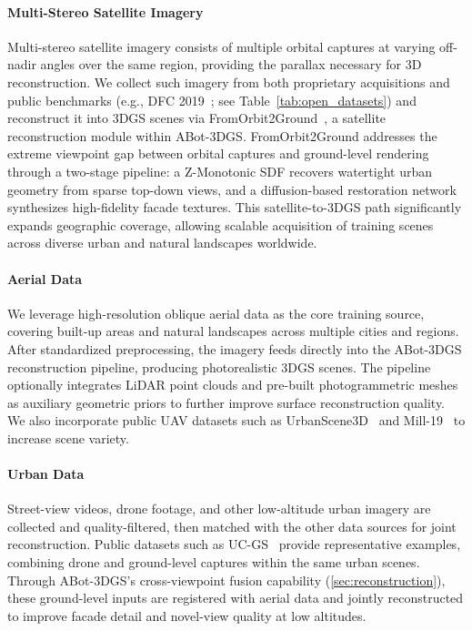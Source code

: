 \paragraph{Multi-Stereo Satellite Imagery}
Multi-stereo satellite imagery consists of multiple orbital captures at varying off-nadir angles over the same region, providing the parallax necessary for 3D reconstruction. We collect such imagery from both proprietary acquisitions and public benchmarks (e.g., DFC 2019~\cite{DFC2019}; see Table~\ref{tab:open_datasets}) and reconstruct it into 3DGS scenes via FromOrbit2Ground~\cite{orbit2ground}, a satellite reconstruction module within ABot-3DGS.
FromOrbit2Ground addresses the extreme viewpoint gap between orbital captures and ground-level rendering through a two-stage pipeline: a Z-Monotonic SDF recovers watertight urban geometry from sparse top-down views, and a diffusion-based restoration network synthesizes high-fidelity facade textures.
This satellite-to-3DGS path significantly expands geographic coverage, allowing scalable acquisition of training scenes across diverse urban and natural landscapes worldwide.

\paragraph{Aerial Data}
We leverage high-resolution oblique aerial data as the core training source, covering built-up areas and natural landscapes across multiple cities and regions. After standardized preprocessing, the imagery feeds directly into the ABot-3DGS reconstruction pipeline, producing photorealistic 3DGS scenes. The pipeline optionally integrates LiDAR point clouds and pre-built photogrammetric meshes as auxiliary geometric priors to further improve surface reconstruction quality. We also incorporate public UAV datasets such as UrbanScene3D~\cite{UrbanScene3D} and Mill-19~\cite{MegaNeRF} to increase scene variety.

\paragraph{Urban Data}
Street-view videos, drone footage, and other low-altitude urban imagery are collected and quality-filtered, then matched with the other data sources for joint reconstruction. Public datasets such as UC-GS~\cite{UCGS} provide representative examples, combining drone and ground-level captures within the same urban scenes. Through ABot-3DGS's cross-viewpoint fusion capability (\cref{sec:reconstruction}), these ground-level inputs are registered with aerial data and jointly reconstructed to improve facade detail and novel-view quality at low altitudes.

